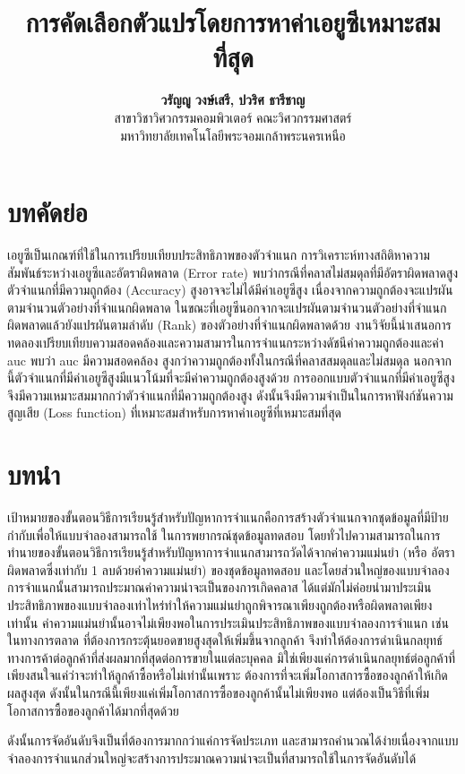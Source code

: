 \documentclass[twoside, twocolumn, 12pt]{article}
\title{การคัดเลือกตัวแปรโดยการหาค่าเอยูซีเหมาะสมที่สุด}
\author{%
\textbf{วรัญญู วงษ์เสรี, ปวริศ ธารีชาญ}\\[1ex]
 สาขาวิชาวิศวกรรมคอมพิวเตอร์ คณะวิศวกรรมศาสตร์  \\ มหาวิทยาลัยเทคโนโลยีพระจอมเกล้าพระนครเหนือ %
}
\date{}
\begin{document}
\maketitle
\section*{บทคัดย่อ}
\quad เอยูซีเป็นเกณฑ์ที่ใช้ในการเปรียบเทียบประสิทธิภาพของตัวจำแนก การวิเคราะห์ทางสถิติหาความสัมพันธ์ระหว่างเอยูซีและอัตราผิดพลาด (Error rate) พบว่ากรณีที่คลาสไม่สมดุลที่มีอัตราผิดพลาดสูง ตัวจำแนกที่มีความถูกต้อง (Accuracy) สูงอาจจะไม่ได้มีค่าเอยูซีสูง เนื่องจากความถูกต้องจะแปรผันตามจำนวนตัวอย่างที่จำแนกผิดพลาด ในขณะที่เอยูซีนอกจากจะแปรผันตามจำนวนตัวอย่างที่จำแนกผิดพลาดแล้วยังแปรผันตามลำดับ (Rank) ของตัวอย่างที่จำแนกผิดพลาดด้วย งานวิจัยนี้นำเสนอการทดลองเปรียบเทียบความสอดคล้องและความสามารในการจำแนกระหว่างดัชนีค่าความถูกต้องและค่า auc พบว่า auc มีความสอดคล้อง สูงกว่าความถูกต้องทั้งในกรณีที่คลาสสมดุลและไม่สมดุล นอกจากนี้ตัวจำแนกที่มีค่าเอยูซีสูงมีแนวโน้มที่จะมีค่าความถูกต้องสูงด้วย การออกแบบตัวจำแนกที่มีค่าเอยูซีสูงจึงมีความเหมาะสมมากกว่าตัวจำแนกที่มีความถูกต้องสูง ดังนั้นจึงมีความจำเป็นในการหาฟังก์ชันความสูญเสีย (Loss function) ที่เหมาะสมสำหรับการหาค่าเอยูซีที่เหมาะสมที่สุด
\section{บทนำ}
เป้าหมายของขั้นตอนวิธีการเรียนรู้สำหรับปัญหาการจำแนกคือการสร้างตัวจำแนกจากชุดข้อมูลที่มีป้ายกำกับเพื่อให้แบบจำลองสามารถใช้ ในการพยากรณ์ชุดข้อมูลทดสอบ โดยทั่วไปความสามารถในการทำนายของขั้นตอนวิธีการเรียนรู้สำหรับปัญหาการจำแนกสามารถวัดได้จากค่าความแม่นยำ (หรือ อัตราผิดพลาดซึ่งเท่ากับ 1 ลบด้วยค่าความแม่นยำ) ของชุดข้อมูลทดสอบ และโดยส่วนใหญ่ของแบบจำลองการจำแนกนั้นสามารถประมาณค่าความน่าจะเป็นของการเกิดคลาส ได้แต่มักไม่ค่อยนำมาประเมินประสิทธิภาพของแบบจำลองเท่าไหร่ทำให้ความแม่นยำถูกพิจารณาเพียงถูกต้องหรือผิดพลาดเพียงเท่านั้น 
ค่าความแม่นยำนั้นอาจไม่เพียงพอในการประเมินประสิทธิภาพของแบบจำลองการจำแนก เช่น ในทางการตลาด ที่ต้องการกระตุ้นยอดขายสูงสุดให้เพิ่มขึ้นจากลูกค้า จึงทำให้ต้องการดําเนินกลยุทธ์ทางการค้าต่อลูกค้าที่ส่งผลมากที่สุดต่อการขายในแต่ละบุคคล มิใช่เพียงแค่การดําเนินกลยุทธ์ต่อลูกค้าที่เพียงสนใจแค่ว่าจะทำให้ลูกค้าซื้อหรือไม่เท่านั้นเพราะ ต้องการที่จะเพิ่มโอกาสการซื้อของลูกค้าให้เกิดผลสูงสุด ดังนั้นในกรณีนี้เพียงแค่เพิ่มโอกาสการซื้อของลูกค้านั้นไม่เพียงพอ แต่ต้องเป็นวิธีที่เพิ่มโอกาสการซื้อของลูกค้าได้มากที่สุดด้วย

ดังนั้นการจัดอันดับจึงเป็นที่ต้องการมากกว่าแค่การจัดประเภท และสามารถคำนวณได้ง่ายเนื่องจากแบบจำลองการจำแนกส่วนใหญ่จะสร้างการประมาณความน่าจะเป็นที่สามารถใช้ในการจัดอันดับได้
\end{document}
